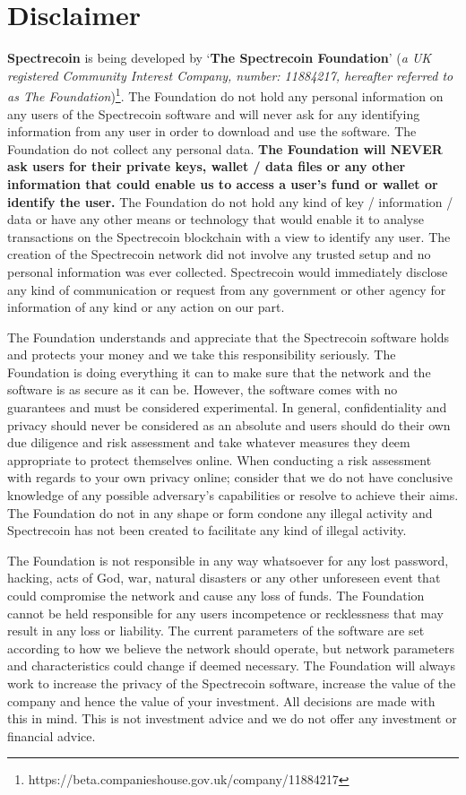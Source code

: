 \chapter{Disclaimer}
\textbf{Spectrecoin} is being developed by ‘\textbf{The Spectrecoin Foundation}’
(\textit{a UK registered Community Interest Company, number: 11884217, hereafter
referred to as The Foundation})\footnote{https://beta.companieshouse.gov.uk/company/11884217}.
The Foundation do not hold any personal information on any users of the
Spectrecoin software and will never ask for any identifying information
from any user in order to download and use the software. The Foundation
do not collect any personal data. \textbf{The Foundation will NEVER ask
users for their private keys, wallet / data files or any other information
that could enable us to access a user’s fund or wallet or identify the
user.} The Foundation do not hold any kind of key / information / data
or have any other means or technology that would enable it to analyse
transactions on the Spectrecoin blockchain with a view to identify any
user. The creation of the Spectrecoin network did not involve any trusted
setup and no personal information was ever collected. Spectrecoin would
immediately disclose any kind of communication or request from any
government or other agency for information of any kind or any action on
our part.



The Foundation understands and appreciate that the Spectrecoin software holds
and protects your money and we take this responsibility seriously. The
Foundation is doing everything it can to make sure that the network and
the software is as secure as it can be. However, the software comes with
no guarantees and must be considered experimental. In general, confidentiality
and privacy should never be considered as an absolute and users should do their
own due diligence and risk assessment and take whatever measures they deem
appropriate to protect themselves online. When conducting a risk assessment
with regards to your own privacy online; consider that we do not have
conclusive knowledge of any possible adversary’s capabilities or resolve to
achieve their aims. The Foundation do not in any shape or form condone any
illegal activity and Spectrecoin has not been created to facilitate any kind
of illegal activity.



The Foundation is not responsible in any way whatsoever for any lost password,
hacking, acts of God, war, natural disasters or any other unforeseen event
that could compromise the network and cause any loss of funds. The Foundation
cannot be held responsible for any users incompetence or recklessness that may
result in any loss or liability. The current parameters of the software are set
according to how we believe the network should operate, but network parameters
and characteristics could change if deemed necessary. The Foundation will always
work to increase the privacy of the Spectrecoin software, increase the value of
the company and hence the value of your investment. All decisions are made with
this in mind. This is not investment advice and we do not offer any investment
or financial advice.



